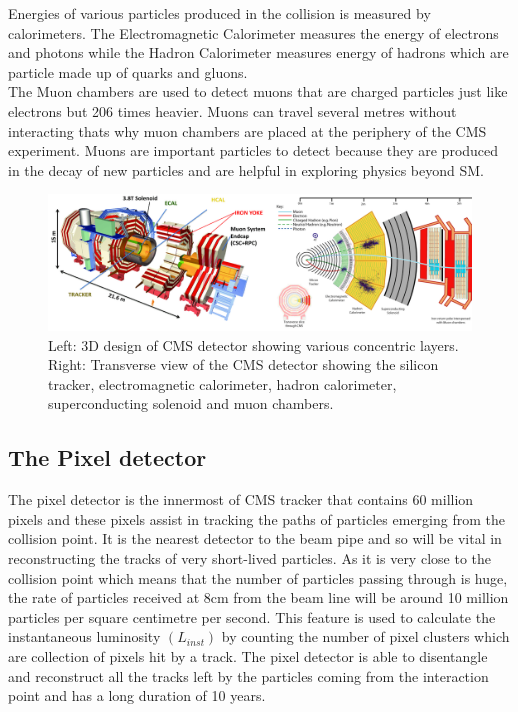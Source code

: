 Energies of various particles produced in the collision is measured by calorimeters. The Electromagnetic Calorimeter measures the energy of electrons and photons while the Hadron Calorimeter measures energy of hadrons which are particle made up of quarks and gluons. \\

The Muon chambers are used to detect muons that are charged particles just like electrons but 206 times heavier. Muons can travel several metres without interacting thats why muon chambers are placed at the periphery of the CMS experiment. Muons are important particles to detect because they are produced in the decay of new particles and are helpful in exploring physics beyond SM.



\begin{figure}[H]
  \centering
  \includegraphics[width=1\columnwidth]{./cmsdetector_merged.png}
  \caption{ \onehalfspacing Left: 3D design of CMS detector showing various concentric layers. Right: Transverse view of the CMS detector showing the silicon tracker, electromagnetic calorimeter, hadron calorimeter, superconducting solenoid and muon chambers. \cite{Chatrchyan:2008aa}}
  \label{fig:CMSdetector}
\end{figure}





\subsection{The Pixel detector}

The pixel detector is the innermost of CMS tracker that contains 60 million pixels and these pixels assist in tracking the paths of particles emerging from the collision point. It is the nearest detector to the beam pipe and so will be vital in reconstructing the tracks of very short-lived particles. As it is very close to the collision point which means that the number of particles passing through is huge, the rate of particles received at 8cm from the beam line will be around 10 million particles per square centimetre per second. This feature is used to calculate the instantaneous luminosity $(L_{inst})$ by counting the number of pixel clusters which are collection of pixels hit by a track. The pixel detector is able to disentangle and reconstruct all the tracks left by the particles coming from the interaction point and has a long duration of 10 years. \\

